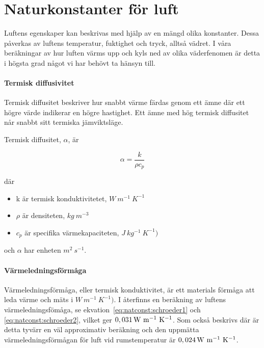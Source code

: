\section{Naturkonstanter för luft}
Luftens egenskaper kan beskrivas med hjälp av en mängd olika konstanter. Dessa påverkas av luftens temperatur, fuktighet och tryck, alltså vädret. I våra beräkningar av hur luften värms upp och kyls ned av olika väderfenomen är detta i högsta grad något vi har behövt ta hänsyn till.


\paragraph{Termisk diffusivitet}

Termisk diffusitet beskriver hur snabbt värme färdas genom ett ämne där ett högre värde indikerar en högre hastighet. Ett ämne med hög termisk diffusitet når snabbt sitt termiska jämviktsläge.

Termisk diffusitet, $\alpha$, är \cite{termiskdiffusivitet}

\begin{equation}
\alpha=\frac{k}{\rho c_p}
\end{equation}

där 
\begin{itemize}
   \item[] k är termisk konduktivitetet, $\unit{W~m^{-1}~K^{-1}}$
   \item[] $\rho$ är densiteten, $\unit{kg~m^{-3}}$
   \item[] $c_p$ är specifika värmekapaciteten, $\unit{J~kg^{-1}~K^{-1})}$
\end{itemize}

och $\alpha$ har enheten $\unit{m^2~s^{-1}}$.




\paragraph{Värmeledningsförmåga} %
Värmeledningsförmåga, eller termisk konduktivitet, är ett materials förmåga att leda värme och mäts i $\unit{W~m^{-1}~K^{-1})}$. I \cite{schroeder00} återfinns en beräkning av luftens värmeledningsfömåga, se ekvation~\eqref{eq:natconst:schroeder1} och \eqref{eq:natconst:schroeder2}, vilket ger $\unit[0,031]{W~m^{-1}~K^{-1}}$. Som också beskrivs där är detta tyvärr en väl approximativ beräkning och den uppmätta värmeledningsförmågan för luft vid rumstemperatur är $\unit[0,024]{W~m^{-1}~K^{-1}}$\cite{physicshandbook}.

